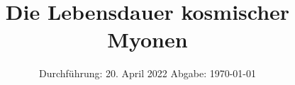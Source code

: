 

\subject{V01}
\title{Die Lebensdauer kosmischer Myonen}
\date{%
  Durchführung: 20. April 2022
  \hspace{3em}
  Abgabe: \today
}


\maketitle
\thispagestyle{empty}
{}






\printbibliography{}



